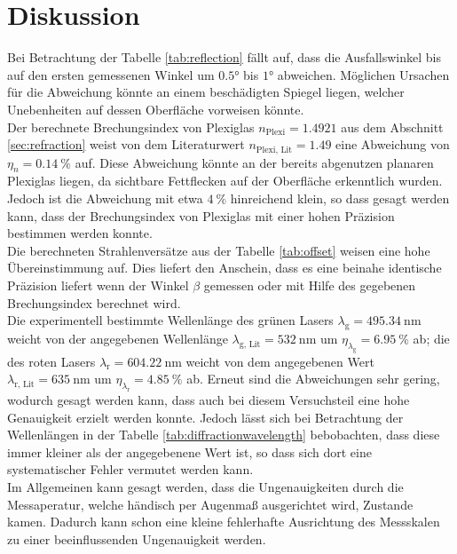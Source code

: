 \section{Diskussion}
\label{sec:Diskussion}
Bei Betrachtung der Tabelle \ref{tab:reflection} fällt auf, dass die Ausfallswinkel bis auf den ersten gemessenen Winkel um $\ang{0.5;;}$ bis 
$\ang{1;;}$ abweichen. Möglichen Ursachen für die Abweichung könnte an einem beschädigten Spiegel liegen, welcher Unebenheiten auf dessen 
Oberfläche vorweisen könnte.\\
Der berechnete Brechungsindex von Plexiglas $n_\text{Plexi}=1.4921$ aus dem Abschnitt \ref{sec:refraction} weist von dem Literaturwert 
$n_\text{Plexi, Lit} = 1.49$\cite{lit} eine Abweichung von $\eta_n = \SI{0.14}{\percent}$ auf. 
Diese Abweichung könnte an der bereits abgenutzen planaren Plexiglas liegen, da sichtbare Fettflecken auf der Oberfläche erkenntlich wurden.
Jedoch ist die Abweichung mit etwa $\SI{4}{\percent}$ hinreichend klein, so dass gesagt werden kann, dass der Brechungsindex von Plexiglas mit einer hohen 
Präzision bestimmen werden konnte.\\ 
Die berechneten Strahlenversätze aus der Tabelle \ref{tab:offset} weisen eine hohe Übereinstimmung auf.
Dies liefert den Anschein, dass es eine beinahe identische Präzision liefert wenn der Winkel $\beta$ gemessen oder mit Hilfe des gegebenen
Brechungsindex berechnet wird.\\
Die experimentell bestimmte Wellenlänge des grünen Lasers $\lambda_\text{g} = \SI{495.34}{\nano\metre}$ weicht von der angegebenen 
Wellenlänge $\lambda_{\text{g, Lit}} = \SI{532}{\nano\metre}$ um  $\eta_{\lambda_\text{g}} = \SI{6.95}{\percent}$ ab; die  des roten Lasers 
$\lambda_\text{r} = \SI{604.22}{\nano\metre}$ weicht von dem angegebenen Wert $\lambda_{\text{r, Lit}} = \SI{635}{\nano\metre}$ um
$\eta_{\lambda_\text{r}} = \SI{4.85}{\percent}$ ab.
Erneut sind die Abweichungen sehr gering, wodurch gesagt werden kann, dass auch bei diesem Versuchsteil eine hohe Genauigkeit erzielt werden konnte.
Jedoch lässt sich bei Betrachtung der Wellenlängen in der Tabelle \ref{tab:diffractionwavelength} bebobachten, dass diese immer kleiner als der angegebenene Wert ist, 
so dass sich dort eine systematischer Fehler vermutet werden kann. \\
Im Allgemeinen kann gesagt werden, dass die Ungenauigkeiten durch die Messaperatur, welche händisch per Augenmaß ausgerichtet wird, Zustande kamen.
Dadurch kann schon eine kleine fehlerhafte Ausrichtung des Messskalen zu einer beeinflussenden Ungenauigkeit werden.